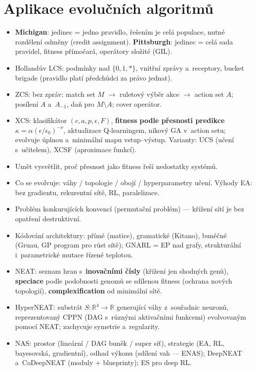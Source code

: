 \documentclass[11pt,a4paper]{article}
\theoremstyle{definition}
\begin{document}
\section{Aplikace evolučních algoritmů}
\begin{itemize}
\item \textbf{Michigan}: jedinec = jedno pravidlo, řešením je celá populace,
 nutné rozdělení odměny (credit assignment).
 \textbf{Pittsburgh}: jedinec = celá sada pravidel, fitness přímočará,
 operátory složité (GIL).
\item Hollandův LCS: podmínky nad $\{0,1,*\}$, vnitřní zprávy a~receptory,
 bucket brigade (pravidlo platí předchůdci za právo jednat).
\item ZCS: bez zpráv; match set $M$ $\to$ ruletový výběr akce $\to$ action set
 $A$; posílení $A$ a~$A_{-1}$, daň pro $M \setminus A$; cover operátor.
\item XCS: klasifikátor $(c,a,p,\epsilon,F)$, \textbf{fitness podle přesnosti
 predikce} $\kappa = \alpha(\epsilon/\epsilon_0)^{-\nu}$, aktualizace
 Q-learningem, nikový GA v~action setu; evolvuje úplnou a~minimální mapu
 vstup--výstup. Varianty: UCS (učení s~učitelem), XCSF (aproximace funkcí).
\item Umět vysvětlit, proč přesnost jako fitness řeší nedostatky
  systémů.
\item Co se evolvuje: váhy / topologie / obojí / hyperparametry učení.
 Výhody EA: bez gradientu, rekurentní sítě, RL, paralelizace.
\item Problém konkurujících konvencí (permutační problém) --- křížení sítí
 je bez opatření destruktivní.
\item Kódování architektury: přímé (matice), gramatické (Kitano), buněčné
 (Gruau, GP program pro růst sítě); GNARL = EP nad grafy, strukturální
 i~parametrické mutace řízené teplotou.
\item NEAT: seznam hran s~\textbf{inovačními čísly} (křížení jen shodných
 genů), \textbf{speciace} podle podobnosti genomů se sdílenou fitness
 (ochrana nových topologií), \textbf{complexification} od minimální sítě.
\item HyperNEAT: substrát $S:\mathbb{R}^4 \to \mathbb{R}$ generující váhy
 z~souřadnic neuronů, reprezentovaný CPPN (DAG s~různými aktivačními
 funkcemi) evolvovaným pomocí NEAT; zachycuje symetrie a~regularity.
\item NAS: prostor (lineární / DAG buněk / super síť), strategie (EA, RL,
 bayesovská, gradientní), odhad výkonu (sdílení vah --- ENAS);
 DeepNEAT a~CoDeepNEAT (moduly + blueprinty); ES pro deep RL.

\end{itemize}
\end{document}
